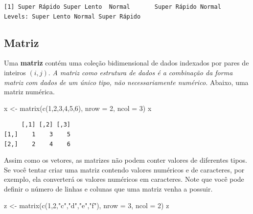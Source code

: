 \documentclass[
  letterpaper,
  DIV=11,
  numbers=noendperiod]{scrreprt}
\newenvironment{Shaded}{\begin{snugshade}}{\end{snugshade}}
\newcommand{\AttributeTok}[1]{\textcolor[rgb]{0.40,0.45,0.13}{#1}}
\newcommand{\DecValTok}[1]{\textcolor[rgb]{0.68,0.00,0.00}{#1}}
\newcommand{\FunctionTok}[1]{\textcolor[rgb]{0.28,0.35,0.67}{#1}}
\newcommand{\NormalTok}[1]{\textcolor[rgb]{0.00,0.23,0.31}{#1}}
\newcommand{\OtherTok}[1]{\textcolor[rgb]{0.00,0.23,0.31}{#1}}
\newcommand{\StringTok}[1]{\textcolor[rgb]{0.13,0.47,0.30}{#1}}
\begin{document}
\begin{verbatim}
[1] Super Rápido Super Lento  Normal       Super Rápido Normal      
Levels: Super Lento Normal Super Rápido
\end{verbatim}

\subsection{Matriz}\label{matriz}

Uma \textbf{matriz} contém uma coleção bidimensional de dados indexados
por pares de inteiros \((i, j)\). \emph{A matriz como estrutura de dados
é a combinação da forma matriz com dados de um único tipo, não
necessariamente numérico.} Abaixo, uma matriz numérica.

\begin{Shaded}
\begin{Highlighting}[]
\NormalTok{x }\OtherTok{\textless{}{-}} \FunctionTok{matrix}\NormalTok{(}\FunctionTok{c}\NormalTok{(}\DecValTok{1}\NormalTok{,}\DecValTok{2}\NormalTok{,}\DecValTok{3}\NormalTok{,}\DecValTok{4}\NormalTok{,}\DecValTok{5}\NormalTok{,}\DecValTok{6}\NormalTok{), }\AttributeTok{nrow =} \DecValTok{2}\NormalTok{, }\AttributeTok{ncol =} \DecValTok{3}\NormalTok{) }
\NormalTok{x}
\end{Highlighting}
\end{Shaded}

\begin{verbatim}
     [,1] [,2] [,3]
[1,]    1    3    5
[2,]    2    4    6
\end{verbatim}

Assim como os vetores, as matrizes não podem conter valores de
diferentes tipos. Se você tentar criar uma matriz contendo valores
numéricos e de caracteres, por exemplo, ela converterá os valores
numéricos em caracteres. Note que você pode definir o número de linhas e
colunas que uma matriz venha a possuir.

\begin{Shaded}
\begin{Highlighting}[]
\NormalTok{z }\OtherTok{\textless{}{-}} \FunctionTok{matrix}\NormalTok{(}\FunctionTok{c}\NormalTok{(}\DecValTok{1}\NormalTok{,}\DecValTok{2}\NormalTok{,}\StringTok{"c"}\NormalTok{,}\StringTok{"d"}\NormalTok{,}\StringTok{"e"}\NormalTok{,}\StringTok{"f"}\NormalTok{), }\AttributeTok{nrow =} \DecValTok{3}\NormalTok{, }\AttributeTok{ncol =} \DecValTok{2}\NormalTok{) }
\NormalTok{z}
\end{Highlighting}
\end{Shaded}
\end{document}
